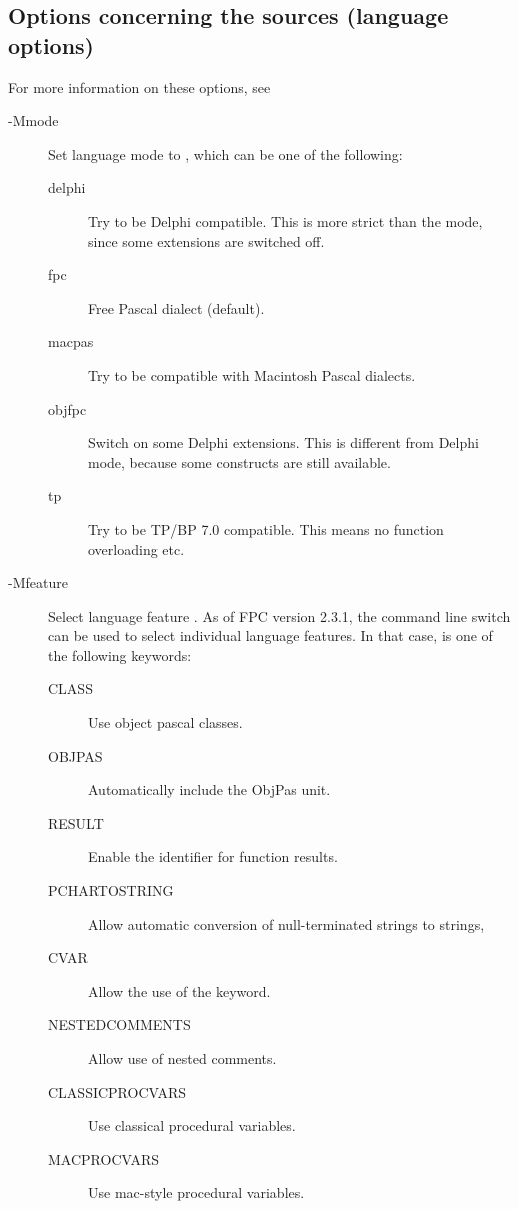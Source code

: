 %
%


\subsection{Options concerning the sources (language options)}
\label{se:sourceoptions}
For more information on these options, see \progref
\begin{description}
\item[-Mmode]  Set language mode to , which can be one of the
following:
\begin{description}
\item[delphi] Try to be Delphi compatible. This is more strict
than the  mode, since some \fpc extensions are switched off.
\item[fpc] Free Pascal dialect (default).
\item[macpas] Try to be compatible with Macintosh Pascal dialects.
\item[objfpc] Switch on some Delphi extensions. This is different from 
Delphi mode, because some \fpc constructs are still available.
\item[tp] Try to be TP/BP 7.0 compatible. This means no function overloading
etc.
\end{description}
\item[-Mfeature]  Select language feature .
As of FPC version 2.3.1, the  command line switch can be used to select individual
language features. In that case,  is one of the following keywords:
\begin{description}
\item[CLASS] Use object pascal classes.
\item[OBJPAS] Automatically include the ObjPas unit.
\item[RESULT] Enable the  identifier for function results.
\item[PCHARTOSTRING] Allow automatic conversion of null-terminated strings
to strings,
\item[CVAR] Allow the use of the  keyword.
\item[NESTEDCOMMENTS] Allow use of nested comments.
\item[CLASSICPROCVARS] Use classical procedural variables.
\item[MACPROCVARS] Use mac-style procedural variables.

\end{description}
\end{description}
